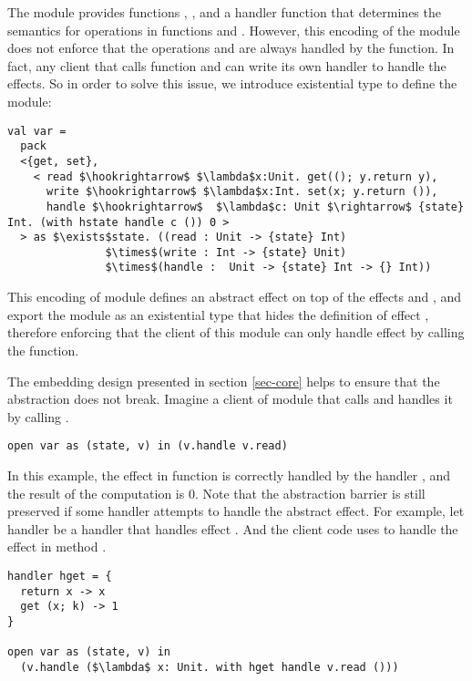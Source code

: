 The module provides functions , , and a handler function  that determines the semantics for operations in functions  and . However, this encoding of the module  does not enforce that the operations  and  are always handled by the  function. In fact, any client that calls function  and  can write its own handler to handle the effects. So in order to solve this issue, we introduce existential type to define the module:
\begin{lstlisting}[mathescape=true]
val var = 
  pack 
  <{get, set}, 
    < read $\hookrightarrow$ $\lambda$x:Unit. get((); y.return y),
      write $\hookrightarrow$ $\lambda$x:Int. set(x; y.return ()),
      handle $\hookrightarrow$  $\lambda$c: Unit $\rightarrow$ {state} Int. (with hstate handle c ()) 0 >
  > as $\exists$state. ((read : Unit -> {state} Int) 
               $\times$(write : Int -> {state} Unit) 
               $\times$(handle :  Unit -> {state} Int -> {} Int))
\end{lstlisting}
This encoding of module defines an abstract effect  on top of the effects  and , and export the module as an existential type that hides the definition of effect , therefore enforcing that the client of this module can only handle effect  by calling the  function. 

The embedding design presented in section \ref{sec-core} helps to ensure that the abstraction does not break. Imagine a client of module  that calls  and handles it by calling . 

\begin{lstlisting}[mathescape=true]
open var as (state, v) in (v.handle v.read)
\end{lstlisting}

In this example, the  effect in function  is correctly handled by the handler , and the result of the computation is 0. Note that the abstraction barrier is still preserved if some handler attempts to handle the abstract effect. For example, let handler  be a handler that handles effect . And the client code uses  to handle the effect in method . 

\begin{lstlisting}[mathescape=true]
handler hget = {
  return x -> x
  get (x; k) -> 1
}

open var as (state, v) in 
  (v.handle ($\lambda$ x: Unit. with hget handle v.read ()))
\end{lstlisting}

